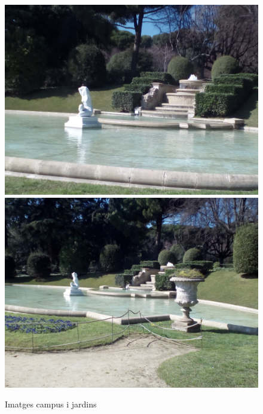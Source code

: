 \begin{figure}[!htb]
				\label{fig:awesome_image2}
			\endminipage\hfill
				\includegraphics[width=\linewidth]{images/experiments/jardi_2}
				\label{fig:awesome_image3}
			\endminipage\hfill
				\includegraphics[width=\linewidth]{images/experiments/jardi2}
				\label{fig:awesome_image3}
			\endminipage
			\caption{Imatges campus i jardins}
		\end{figure}


